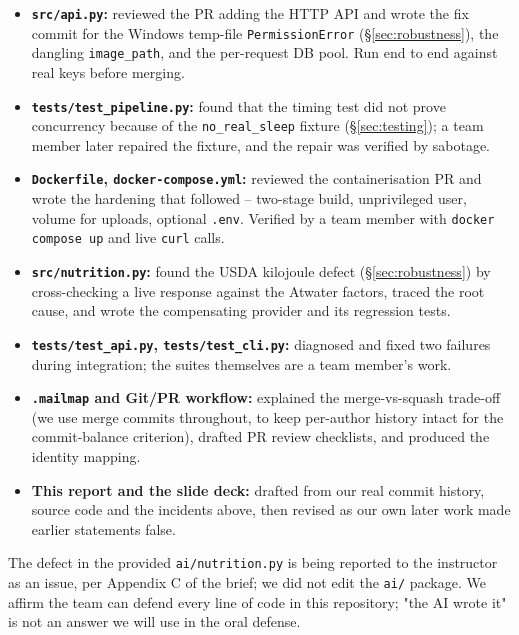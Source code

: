 \documentclass[11pt,a4paper]{article}
\begin{document}
\begin{itemize}[itemsep=3pt]
  \item \textbf{\texttt{src/api.py}:} reviewed the PR adding the HTTP API and wrote the fix commit for the Windows temp-file \texttt{PermissionError} (\S\ref{sec:robustness}), the dangling \texttt{image\_path}, and the per-request DB pool. Run end to end against real keys before merging.
  \item \textbf{\texttt{tests/test\_pipeline.py}:} found that the timing test did not prove concurrency because of the \texttt{no\_real\_sleep} fixture (\S\ref{sec:testing}); a team member later repaired the fixture, and the repair was verified by sabotage.
  \item \textbf{\texttt{Dockerfile}, \texttt{docker-compose.yml}:} reviewed the containerisation PR and wrote the hardening that followed -- two-stage build, unprivileged user, volume for uploads, optional \texttt{.env}. Verified by a team member with \texttt{docker compose up} and live \texttt{curl} calls.
  \item \textbf{\texttt{src/nutrition.py}:} found the USDA kilojoule defect (\S\ref{sec:robustness}) by cross-checking a live response against the Atwater factors, traced the root cause, and wrote the compensating provider and its regression tests.
  \item \textbf{\texttt{tests/test\_api.py}, \texttt{tests/test\_cli.py}:} diagnosed and fixed two failures during integration; the suites themselves are a team member's work.
  \item \textbf{\texttt{.mailmap} and Git/PR workflow:} explained the merge-vs-squash trade-off (we use merge commits throughout, to keep per-author history intact for the commit-balance criterion), drafted PR review checklists, and produced the identity mapping.
  \item \textbf{This report and the slide deck:} drafted from our real commit history, source code and the incidents above, then revised as our own later work made earlier statements false.
\end{itemize}

The defect in the provided \texttt{ai/nutrition.py} is being reported to the instructor as an issue, per Appendix C of the brief; we did not edit the \texttt{ai/} package. We affirm the team can defend every line of code in this repository; "the AI wrote it" is not an answer we will use in the oral defense.

\end{document}
